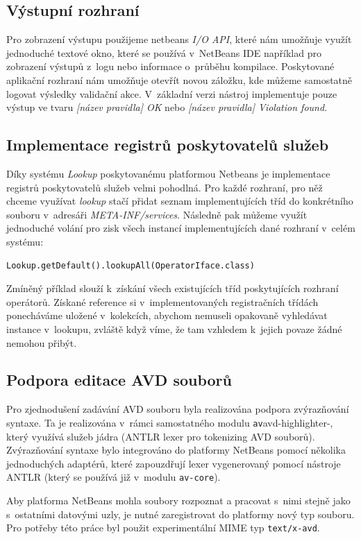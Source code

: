 \subsection{Výstupní rozhraní}
Pro zobrazení výstupu použijeme netbeans \emph{I/O API}, které nám umožňuje využít jednoduché textové okno, které se používá v~NetBeans IDE například pro zobrazení výstupů z~logu nebo informace o~průběhu kompilace. Poskytované aplikační rozhraní nám umožňuje otevřít novou záložku, kde můžeme samostatně logovat výsledky validační akce. V~základní verzi nástroj implementuje pouze výstup ve tvaru \emph{[název pravidla] OK} nebo \emph{[název pravidla] Violation found.}

\subsection{Implementace registrů poskytovatelů služeb}
Díky systému \emph{Lookup} poskytovanému platformou Netbeans je implementace registrů poskytovatelů služeb velmi pohodlná. Pro každé rozhraní, pro něž chceme využívat \emph{lookup} stačí přidat seznam implementujících tříd do konkrétního souboru v~adresáři \emph{META-INF/services}. Následně pak můžeme využít jednoduché volání pro zisk všech instancí implementujících dané rozhraní v~celém systému:

\begin{verbatim}
Lookup.getDefault().lookupAll(OperatorIface.class)
\end{verbatim}

Zmíněný příklad slouží k~získání všech existujících tříd poskytujících rozhraní operátorů. Získané reference si v~implementovaných registračních třídách ponecháváme uložené v~kolekcích, abychom nemuseli opakovaně vyhledávat instance v~lookupu, zvláště když víme, že tam vzhledem k~jejich povaze žádné nemohou přibýt.

\subsection{Podpora editace AVD souborů}
Pro zjednodušení zadávání AVD souboru byla realizována podpora zvýrazňování syntaxe. Ta je realizována v~rámci samostatného modulu \verb-av-avd-highlighter-, který využívá služeb jádra (ANTLR lexer pro tokenizing AVD souborů). Zvýrazňování syntaxe bylo integrováno do platformy NetBeans pomocí několika jednoduchých adaptérů, které zapouzdřují lexer vygenerovaný pomocí nástroje ANTLR (který se používá již v~modulu \verb+av-core+).

Aby platforma NetBeans mohla soubory rozpoznat a pracovat s~nimi stejně jako s~ostatními datovými uzly, je nutné zaregistrovat do platformy nový typ souboru. Pro potřeby této práce byl použit experimentální MIME typ \verb+text/x-avd+.

